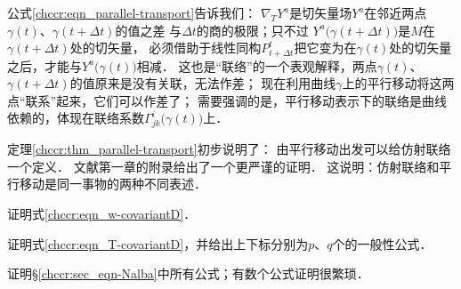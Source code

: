 公式\eqref{chccr:eqn_parallel-transport}告诉我们：
$\nabla_T Y^a$是切矢量场$Y^a$在邻近两点$\gamma(t)$、$\gamma(t+\Delta t)$的值之差
与$\Delta t$的商的极限；只不过 $Y^a\bigl(\gamma(t+\Delta t)\bigr)$是$M$在$\gamma(t+\Delta t)$处的切矢量，
必须借助于线性同构$P_{t+\Delta t}^t$把它变为在$\gamma(t)$处的切矢量之后，才能与$Y^a\bigl(\gamma(t)\bigr)$相减． 
这也是“联络”的一个表观解释，两点$\gamma(t)$、$\gamma(t+\Delta t)$的值原来是没有关联，无法作差；
现在利用曲线$\gamma$上的平行移动将这两点“联系”起来，它们可以作差了；
需要强调的是，平行移动表示下的联络是曲线依赖的，体现在联络系数$\Gamma^i_{jk}\bigl(\gamma(t)\bigr)$上．


定理\ref{chccr:thm_parallel-transport}初步说明了：
由平行移动出发可以给仿射联络一个定义．
文献\parencite{wuhx2014cb}第一章的附录给出了一个更严谨的证明．
这说明：仿射联络和平行移动是同一事物的两种不同表述．




\begin{exercise}
	证明式\eqref{chccr:eqn_w-covariantD}．
\end{exercise}

\begin{exercise}
	证明式\eqref{chccr:eqn_T-covariantD}，并给出上下标分别为$p$、$q$个的一般性公式．
\end{exercise}

\begin{exercise}
	证明\S\ref{chccr:sec_eqn-Nalba}中所有公式；有数个公式证明很繁琐．
\end{exercise}


